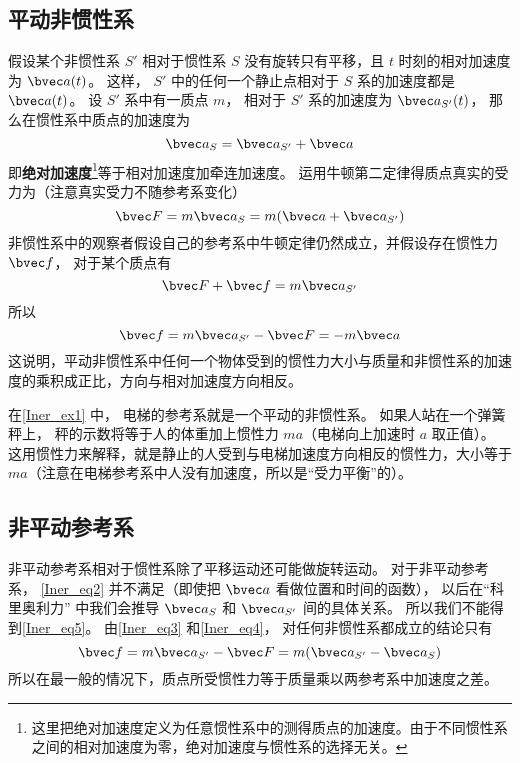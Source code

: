 \subsection{平动非惯性系}
假设某个非惯性系 $S'$ 相对于惯性系 $S$ 没有旋转只有平移，且 $t$ 时刻的相对加速度为 $\bvec a(t)$。 这样， $S'$ 中的任何一个静止点相对于 $S$ 系的加速度都是 $\bvec a(t)$。 设 $S'$ 系中有一质点 $m$， 相对于 $S'$ 系的加速度为 $\bvec a_{S'} (t)$， 那么在惯性系中质点的加速度为
\begin{equation}\label{Iner_eq2}
\bvec a_{S} = \bvec a_{S'} + \bvec a
\end{equation}
即\textbf{绝对加速度}\footnote{这里把绝对加速度定义为任意惯性系中的测得质点的加速度。由于不同惯性系之间的相对加速度为零，绝对加速度与惯性系的选择无关。}等于相对加速度加牵连加速度。 运用牛顿第二定律得质点真实的受力为（注意真实受力不随参考系变化）
\begin{equation}\label{Iner_eq3}
\bvec F = m \bvec a_{S} = m(\bvec a + \bvec a_{S'} )
\end{equation}
非惯性系中的观察者假设自己的参考系中牛顿定律仍然成立，并假设存在惯性力 $\bvec f$， 对于某个质点有
\begin{equation}\label{Iner_eq4}
\bvec F + \bvec f = m \bvec a_{S'}
\end{equation}
所以
\begin{equation}\label{Iner_eq5}
\bvec f = m \bvec a_{S'} - \bvec F =  - m\bvec a
\end{equation}
这说明，平动非惯性系中任何一个物体受到的惯性力大小与质量和非惯性系的加速度的乘积成正比，方向与相对加速度方向相反。

在\autoref{Iner_ex1} 中， 电梯的参考系就是一个平动的非惯性系。 如果人站在一个弹簧秤上， 秤的示数将等于人的体重加上惯性力 $ma$（电梯向上加速时 $a$ 取正值）。 这用惯性力来解释，就是静止的人受到与电梯加速度方向相反的惯性力，大小等于 $ma$（注意在电梯参考系中人没有加速度，所以是“受力平衡”的）。

\subsection{非平动参考系}

非平动参考系相对于惯性系除了平移运动还可能做旋转运动。 对于非平动参考系， \autoref{Iner_eq2} 并不满足（即使把 $\bvec a$ 看做位置和时间的函数）， 以后在“科里奥利力” 中我们会推导 $\bvec a_{S}$ 和 $\bvec a_{S'}$ 间的具体关系。 所以我们不能得到\autoref{Iner_eq5}。 由\autoref{Iner_eq3} 和\autoref{Iner_eq4}， 对任何非惯性系都成立的结论只有
\begin{equation}
\bvec f = m \bvec a_{S'} - \bvec F =  m( \bvec a_{S'} - \bvec a_{S})
\end{equation}
所以在最一般的情况下，质点所受惯性力等于质量乘以两参考系中加速度之差。

